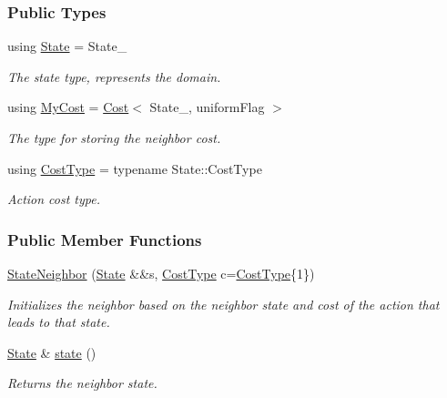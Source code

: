\subsubsection*{Public Types}
\begin{DoxyCompactItemize}
\item 
using \hyperlink{structStateNeighbor_a89b4e99e2112a45b42dc5a899330aa02}{State} = State\+\_\+\hypertarget{structStateNeighbor_a89b4e99e2112a45b42dc5a899330aa02}{}\label{structStateNeighbor_a89b4e99e2112a45b42dc5a899330aa02}

\begin{DoxyCompactList}\small\item\em The state type, represents the domain. \end{DoxyCompactList}\item 
using \hyperlink{structStateNeighbor_a4585610f50c25cde22e3118840e4710d}{My\+Cost} = \hyperlink{structCost}{Cost}$<$ State\+\_\+, uniform\+Flag $>$\hypertarget{structStateNeighbor_a4585610f50c25cde22e3118840e4710d}{}\label{structStateNeighbor_a4585610f50c25cde22e3118840e4710d}

\begin{DoxyCompactList}\small\item\em The type for storing the neighbor cost. \end{DoxyCompactList}\item 
using \hyperlink{structStateNeighbor_ad2c4f8b025c66264933770cb87e25e7e}{Cost\+Type} = typename State\+::\+Cost\+Type\hypertarget{structStateNeighbor_ad2c4f8b025c66264933770cb87e25e7e}{}\label{structStateNeighbor_ad2c4f8b025c66264933770cb87e25e7e}

\begin{DoxyCompactList}\small\item\em Action cost type. \end{DoxyCompactList}\end{DoxyCompactItemize}
\subsubsection*{Public Member Functions}
\begin{DoxyCompactItemize}
\item 
\hyperlink{structStateNeighbor_a77aa0d691e02d93773f7d146a869b8f2}{State\+Neighbor} (\hyperlink{structCost_a35c84b427ff64f117a9393e8d46b0f85}{State} \&\&s, \hyperlink{structCost_a22a996cdc08b472c30d1f410496e041a}{Cost\+Type} c=\hyperlink{structCost_a22a996cdc08b472c30d1f410496e041a}{Cost\+Type}\{1\})
\begin{DoxyCompactList}\small\item\em Initializes the neighbor based on the neighbor state and cost of the action that leads to that state. \end{DoxyCompactList}\item 
\hyperlink{structCost_a35c84b427ff64f117a9393e8d46b0f85}{State} \& \hyperlink{structStateNeighbor_ae718526450e45b0d8c3edc1bb2004984}{state} ()
\begin{DoxyCompactList}\small\item\em Returns the neighbor state. \end{DoxyCompactList}\end{DoxyCompactItemize}
